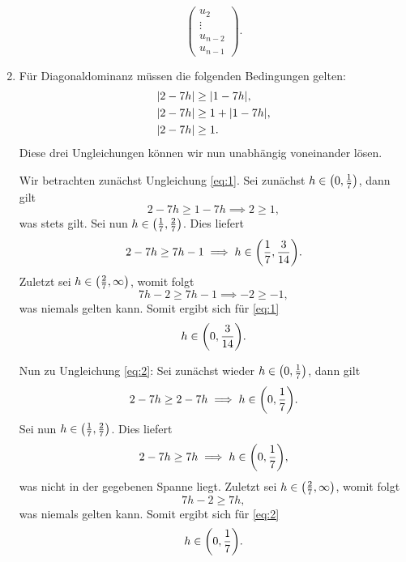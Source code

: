 \documentclass{exercise}
\begin{document}
\begin{enumerate}
\[\begin{pmatrix}
                u_2\\
                \vdots\\
                u_{n - 2}\\
                u_{n - 1}
            \end{pmatrix}.
        \]
        \item Für Diagonaldominanz müssen die folgenden Bedingungen gelten:
        \begin{align}
            \absolute*{2 - 7h} &\ge \absolute*{1 - 7h},\label{eq:1}\\
            \absolute*{2 - 7h} &\ge 1 + \absolute*{1 - 7h},\label{eq:2}\\
            \absolute*{2 - 7h} &\ge 1.\label{eq:3}
        \end{align}
        Diese drei Ungleichungen können wir nun unabhängig voneinander lösen.
        
        Wir betrachten zunächst Ungleichung \eqref{eq:1}. Sei zunächst \(h \in \parentheses*{0, \frac{1}{7}}\), dann gilt
        \[
            2 - 7h \ge 1 - 7h \implies 2 \ge 1,
        \]
        was stets gilt.
        Sei nun \(h \in \parentheses*{\frac{1}{7}, \frac{2}{7}}\).
        Dies liefert
        \[
            2 - 7h \ge 7h - 1 \implies h \in \parentheses*{\frac{1}{7}, \frac{3}{14}}.
        \]
        Zuletzt sei \(h \in \parentheses*{\frac{2}{7}, \infty}\), womit folgt
        \[
            7h - 2 \ge 7h - 1 \implies -2 \ge -1,
        \]
        was niemals gelten kann.
        Somit ergibt sich für \eqref{eq:1}
        \[
            h \in \parentheses*{0, \frac{3}{14}}.
        \]

        Nun zu Ungleichung \eqref{eq:2}: Sei zunächst wieder \(h \in \parentheses*{0, \frac{1}{7}}\), dann gilt
        \[
            2 - 7h \ge 2 - 7h \implies h \in \parentheses*{0, \frac{1}{7}}.
        \]
        Sei nun \(h \in \parentheses*{\frac{1}{7}, \frac{2}{7}}\).
        Dies liefert
        \[
            2 - 7h \ge 7h \implies h \in \parentheses*{0, \frac{1}{7}},
        \]
        was nicht in der gegebenen Spanne liegt.
        Zuletzt sei \(h \in \parentheses*{\frac{2}{7}, \infty}\), womit folgt
        \[
            7h - 2 \ge 7h,
        \]
        was niemals gelten kann.
        Somit ergibt sich für \eqref{eq:2}
        \[
            h \in \parentheses*{0, \frac{1}{7}}.
        \]


\end{enumerate}
\end{document}
